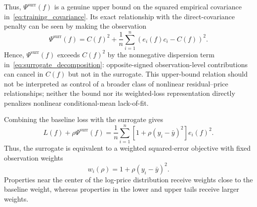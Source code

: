 \documentclass[10pt]{article}
\theoremstyle{definition}
\newcommand{\1}{\mathbf{1}}
\newcommand{\oldtext}[1]{\textcolor{blue}{\sout{#1}}}
\newcommand{\newtext}[1]{\textcolor{impGreen}{#1}}
\begin{document}
{
Thus, $\Psi^{\mathrm{surr}}(f)$ is a genuine upper bound on the squared empirical covariance in~\eqref{eq:training_covariance}. Its exact relationship with the direct-covariance penalty can be seen by making the observation
\begin{equation}
\label{eq:surrogate_decomposition}
\Psi^{\mathrm{surr}}(f)
=
C(f)^2
+
\frac{1}{n}
\sum_{i=1}^n
\left(e_i(f)c_i-C(f)\right)^2.
\end{equation}
\newtext{Hence, $\Psi^{\mathrm{surr}}(f)$ exceeds $C(f)^2$ by the nonnegative dispersion term in~\eqref{eq:surrogate_decomposition}: opposite-signed observation-level contributions can cancel in $C(f)$ but not in the surrogate. This upper-bound relation should not be interpreted as control of a broader class of nonlinear residual--price relationships; neither the bound nor its weighted-loss representation directly penalizes nonlinear conditional-mean lack-of-fit.}
}


Combining the baseline loss with the surrogate gives
\begin{equation}
\label{eq:surrogate_weighted_loss}
L(f)+\rho\Psi^{\mathrm{surr}}(f)
=
\frac{1}{n}\sum_{i=1}^n
\left[1+\rho(y_i-\bar y)^2\right]e_i(f)^2.
\end{equation}
Thus, the surrogate is equivalent to a weighted squared-error objective with fixed observation weights
\begin{equation}
\label{eq:surrogate_weights}
w_i(\rho)=1+\rho(y_i-\bar y)^2.
\end{equation}
Properties near the center of the log-price distribution receive weights close to the baseline weight, whereas properties in the lower and upper tails receive larger weights.


\end{document}
